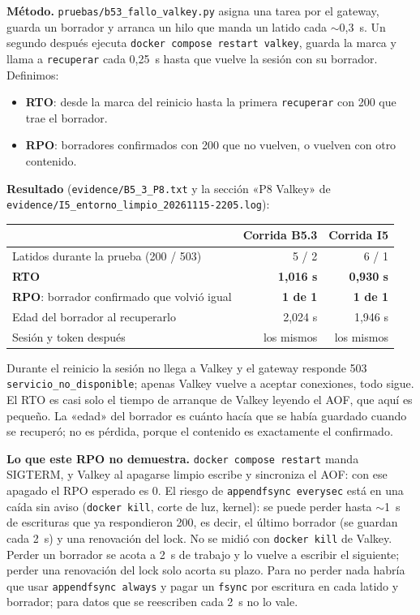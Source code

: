\documentclass[10pt,letterpaper]{article}
\newcommand{\ev}[1]{{\footnotesize\texttt{evidence/\allowbreak #1}}}
\begin{document}
\textbf{Método.} \texttt{pruebas/b53\_fallo\_valkey.py} asigna una tarea por el gateway, guarda un borrador y
arranca un hilo que manda un latido cada $\sim$0,3~s. Un segundo después ejecuta
\texttt{docker compose restart valkey}, guarda la marca y llama a \texttt{recuperar} cada 0,25~s hasta que
vuelve la sesión con su borrador. Definimos:
\begin{itemize}\setlength{\itemsep}{1pt}
\item \textbf{RTO}: desde la marca del reinicio hasta la primera \texttt{recuperar} con 200 que trae el
borrador.
\item \textbf{RPO}: borradores confirmados con 200 que no vuelven, o vuelven con otro contenido.
\end{itemize}

\textbf{Resultado} (\ev{B5\_3\_P8.txt} y la sección «P8 Valkey» de \ev{I5\_entorno\_limpio\_20261115-2205.log}):

\begin{center}\small
\begin{tabular}{@{}lrr@{}}
\toprule
 & Corrida B5.3 & Corrida I5 \\
\midrule
Latidos durante la prueba (200 / 503) & 5 / 2 & 6 / 1 \\
\textbf{RTO} & \textbf{1,016 s} & \textbf{0,930 s} \\
\textbf{RPO}: borrador confirmado que volvió igual & \textbf{1 de 1} & \textbf{1 de 1} \\
Edad del borrador al recuperarlo & 2,024 s & 1,946 s \\
Sesión y token después & los mismos & los mismos \\
\bottomrule
\end{tabular}
\end{center}

Durante el reinicio la sesión no llega a Valkey y el gateway responde 503 \texttt{servicio\_no\_disponible};
apenas Valkey vuelve a aceptar conexiones, todo sigue. El RTO es casi solo el tiempo de arranque de Valkey
leyendo el AOF, que aquí es pequeño. La «edad» del borrador es cuánto hacía que se había guardado cuando se
recuperó; no es pérdida, porque el contenido es exactamente el confirmado.

\textbf{Lo que este RPO no demuestra.} \texttt{docker compose restart} manda SIGTERM, y Valkey al apagarse
limpio escribe y sincroniza el AOF: con ese apagado el RPO esperado es 0. El riesgo de
\texttt{appendfsync everysec} está en una caída sin aviso (\texttt{docker kill}, corte de luz, kernel): se
puede perder hasta $\sim$1~s de escrituras que ya respondieron 200, es decir, el último borrador (se
guardan cada 2~s) y una renovación del lock. No se midió con \texttt{docker kill} de Valkey. Perder un
borrador se acota a 2~s de trabajo y lo vuelve a escribir el siguiente; perder una renovación del lock solo
acorta su plazo. Para no perder nada habría que usar \texttt{appendfsync always} y pagar un \texttt{fsync}
por escritura en cada latido y borrador; para datos que se reescriben cada 2~s no lo vale.
\end{document}
